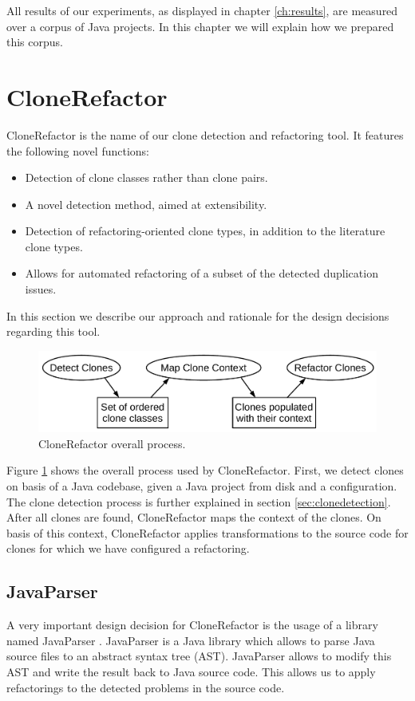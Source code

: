 All results of our experiments, as displayed in chapter \ref{ch:results}, are measured over a corpus of Java projects. In this chapter we will explain how we prepared this corpus.

\section{CloneRefactor}
CloneRefactor is the name of our clone detection and refactoring tool. It features the following novel functions:
\begin{itemize}
  \item Detection of clone classes rather than clone pairs.
  \item A novel detection method, aimed at extensibility.
  \item Detection of refactoring-oriented clone types, in addition to the literature clone types.
  \item Allows for automated refactoring of a subset of the detected duplication issues.
\end{itemize}
In this section we describe our approach and rationale for the design decisions regarding this tool.

\begin{figure}[H]
  \centering
  \includegraphics[width=0.8\columnwidth]{img/CloneRefactorOverall}
  \caption{CloneRefactor overall process.}
  \label{fig:clonerefactorprocess}
\end{figure}

Figure \ref{fig:clonerefactorprocess} shows the overall process used by CloneRefactor. First, we detect clones on basis of a Java codebase, given a Java project from disk and a configuration. The clone detection process is further explained in section \ref{sec:clonedetection}. After all clones are found, CloneRefactor maps the context of the clones. On basis of this context, CloneRefactor applies transformations to the source code for clones for which we have configured a refactoring.

\subsection{JavaParser}
A very important design decision for CloneRefactor is the usage of a library named JavaParser \cite{tomassetti2017javaparser}. JavaParser is a Java library which allows to parse Java source files to an abstract syntax tree (AST). JavaParser allows to modify this AST and write the result back to Java source code. This allows us to apply refactorings to the detected problems in the source code.

